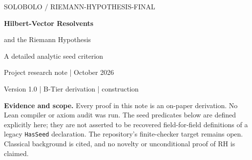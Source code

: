 \documentclass[11pt,a4paper]{article}
\numberwithin{equation}{section}
\theoremstyle{definition}
\theoremstyle{remark}
\newcommand{\norm}[1]{\lVert #1\rVert}
\begin{document}
\begin{center}
{\small\sffamily\color{linkblue} SOLOBOLO \enspace / \enspace RIEMANN-HYPOTHESIS-FINAL}\par
\vspace{9pt}
{\LARGE\bfseries\color{ink} Hilbert-Vector Resolvents\par
and the Riemann Hypothesis}\par
\vspace{7pt}
{\large A detailed analytic seed criterion}\par
\vspace{9pt}
{\small Project research note \enspace |  October 2026}\par
{\small Version 1.0 \enspace | \enspace B-Tier derivation \enspace | \enspace construction}
\end{center}
\vspace{5pt}
\begin{abstract}
We give a precise, self-contained analytic formulation of a Hilbert-vector
anchor for the Riemann hypothesis. Let $\Theta$ be the entire function
determined by $\Theta(w^2)=\xi(\tfrac12+w)$, and put
$L(a)=\Theta'(a)/\Theta(a)$ for $a\geq0$. We prove that RH is equivalent
to the existence of one Hilbert space, one bounded nonnegative self-adjoint
operator $K$, and one fixed vector $v$ such that
$\frac{\mathrm d}{\mathrm da}(aL(a))=\norm{(I+aK)^{-1}v}^2$
on a nonempty positive interval. The derivation includes the resolvent
calculus, its divided-difference Gram kernel, and the analytic continuation
that excludes zeros off the negative real axis. A possible $C/a$ ambiguity
is removed using $\Theta(0)\ne0$, rather than suppressed by an unstated
normalization. The reverse implication constructs a positive diagonal
operator from the zero product under RH, with multiplicities counted
correctly. We also develop the spectral-measure and all-order moment
formulations, explain basepoint shifts, and prove that no exactly calibrated
finite-dimensional model can suffice. The result is an analytic equivalence;
it does not construct the required seed unconditionally or produce an
accepted finite witness.
\end{abstract}
\begin{scopebox}
\small\textbf{Evidence and scope.} Every proof in this note is an on-paper
derivation. No Lean compiler or axiom audit was run. The seed predicates
below are defined explicitly here; they are not asserted to be recovered
field-for-field definitions of a legacy \texttt{HasSeed} declaration.
The repository's finite-checker target remains open. Classical background
is cited, and no novelty or unconditional proof of RH is claimed.
\end{scopebox}
\vspace{5pt}
\end{document}
